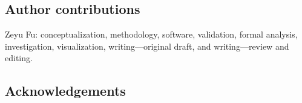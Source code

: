 \subsection*{Author contributions}

Zeyu Fu: conceptualization, methodology, software, validation, formal
analysis, investigation, visualization, writing---original draft, and
writing---review and editing.

\ifdefined\DRAFTTODO
\subsection*{Acknowledgements}

\fi
